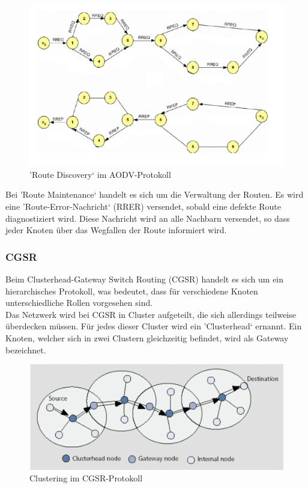 \begin{figure}[H] 
	\centering
	\includegraphics[scale=0.5]{Bilder/aodv}
	\caption{'Route Discovery‘ im AODV-Protokoll\cite{d:timm}}
	\label{f:aodv}
\end{figure}

Bei 'Route Maintenance‘ handelt es sich um die Verwaltung der Routen. Es wird eine 'Route-Error-Nachricht‘ (RRER) versendet, sobald eine defekte Route diagnostiziert wird. Diese Nachricht wird an alle Nachbarn versendet, so dass jeder Knoten über das Wegfallen der Route informiert wird.

\subsubsection{CGSR}\label{ss:CGSR}

Beim Clusterhead-Gateway Switch Routing (CGSR) handelt es sich um ein hierarchisches Protokoll, was bedeutet, dass für verschiedene Knoten unterschiedliche Rollen vorgesehen sind. \\
Das Netzwerk wird bei CGSR in Cluster aufgeteilt, die sich allerdings teilweise überdecken müssen. Für jedes dieser Cluster wird ein 'Clusterhead‘ ernannt. Ein Knoten, welcher sich in zwei Clustern gleichzeitig befindet, wird als Gateway bezeichnet.

\begin{figure}[H] 
	\centering
	\includegraphics[scale=0.5]{Bilder/cgsr}
	\caption{Clustering im CGSR-Protokoll\cite{d:timm}}
	\label{f:cgsr}
\end{figure}

